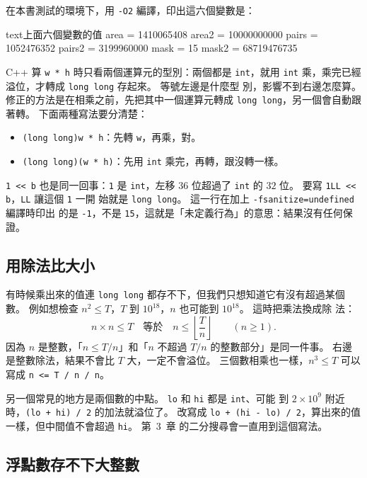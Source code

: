在本書測試的環境下，用 \texttt{-O2} 編譯，印出這六個變數是：

\begin{code}{text}{上面六個變數的值}
area  = 1410065408     area2  = 10000000000
pairs = 1052476352     pairs2 = 3199960000
mask  = 15             mask2  = 68719476735
\end{code}

C++ 算 \texttt{w * h} 時只看兩個運算元的型別：兩個都是 \texttt{int}，就用
\texttt{int} 乘，乘完已經溢位，才轉成 \texttt{long long} 存起來。 等號左邊是什麼型
別，影響不到右邊怎麼算。 修正的方法是在相乘之前，先把其中一個運算元轉成
\texttt{long long}，另一個會自動跟著轉。 下面兩種寫法要分清楚：

\begin{itemize}
\item \texttt{(long long)w * h}：先轉 \texttt{w}，再乘，對。
\item \texttt{(long long)(w * h)}：先用 \texttt{int} 乘完，再轉，跟沒轉一樣。
\end{itemize}

\texttt{1 << b} 也是同一回事：\texttt{1} 是 \texttt{int}，左移 $36$ 位超過了
\texttt{int} 的 $32$ 位。 要寫 \texttt{1LL << b}，\texttt{LL} 讓這個 \texttt{1} 一開
始就是 \texttt{long long}。 這一行在加上 \texttt{-fsanitize=undefined} 編譯時印出
的是 \texttt{-1}，不是 \texttt{15}，這就是「未定義行為」的意思：結果沒有任何保證。

\subsection{用除法比大小}

有時候乘出來的值連 \texttt{long long} 都存不下，但我們只想知道它有沒有超過某個數。
例如想檢查 $n^2 \le T$，$T$ 到 $10^{18}$，$n$ 也可能到 $10^{18}$。 這時把乘法換成除
法：
\[
n \times n \le T \quad\text{等於}\quad n \le \left\lfloor \frac{T}{n} \right\rfloor
\qquad (n \ge 1).
\]
因為 $n$ 是整數，「$n \le T/n$」和「$n$ 不超過 $T/n$ 的整數部分」是同一件事。 右邊
是整數除法，結果不會比 $T$ 大，一定不會溢位。 三個數相乘也一樣，$n^3 \le T$ 可以
寫成 \texttt{n <= T / n / n}。

另一個常見的地方是兩個數的中點。 \texttt{lo} 和 \texttt{hi} 都是 \texttt{int}、可能
到 $2 \times 10^9$ 附近時，\texttt{(lo + hi) / 2} 的加法就溢位了。 改寫成
\texttt{lo + (hi - lo) / 2}，算出來的值一樣，但中間值不會超過 \texttt{hi}。 第~3~章
的二分搜尋會一直用到這個寫法。

\subsection{浮點數存不下大整數}

